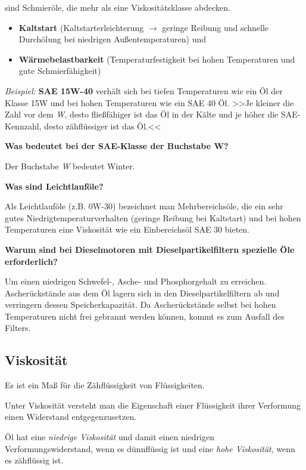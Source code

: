 sind Schmieröle, die mehr als eine Viskositätsklasse abdecken.

\begin{itemize}
\item
  \textbf{Kaltstart} (Kaltstarterleichterung $\to$ geringe Reibung und
  schnelle Durchölung bei niedrigen Außentemperaturen) und
\item
  \textbf{Wärmebelastbarkeit} (Temperaturfestigkeit bei hohen
  Temperaturen und gute Schmierfähigkeit)
\end{itemize}

\emph{Beispiel:} \textbf{SAE 15W-40} verhält sich bei tiefen
Temperaturen wie ein Öl der Klasse 15W und bei hohen Temperaturen wie
ein SAE 40 Öl. >>Je kleiner die Zahl vor dem \emph{W}, desto
fließfähiger ist das Öl in der Kälte und je höher die SAE-Kennzahl,
desto zähflüssiger ist das Öl.<<

\textbf{Was bedeutet bei der SAE-Klasse der Buchstabe W?}

Der Buchstabe \emph{W} bedeutet Winter.

\textbf{Was sind Leichtlauföle?}

Als Leichtlauföle (z.B. 0W-30) bezeichnet man Mehrbereichsöle, die ein
sehr gutes Niedrigtemperaturverhalten (geringe Reibung bei Kaltstart)
und bei hohen Temperaturen eine Viskosität wie ein Einbereichsöl SAE 30
bieten.

\textbf{Warum sind bei Dieselmotoren mit Dieselpartikelfiltern spezielle
Öle erforderlich?}

Um einen niedrigen Schwefel-, Asche- und Phosphorgehalt zu erreichen.
Ascherückstände aus dem Öl lagern sich in den Dieselpartikelfiltern ab
und verringern dessen Speicherkapazität. Da Ascherückstände selbst bei
hohen Temperaturen nicht frei gebrannt werden können, kommt es zum
Ausfall des Filters.

\subsection{Viskosität}\label{viskositaet}

Es ist ein Maß für die Zähflüssigkeit von Flüssigkeiten.

Unter Viskosität versteht man die Eigenschaft einer Flüssigkeit ihrer
Verformung einen Widerstand entgegenzusetzen.

Öl hat eine \emph{niedrige Viskosität} und damit einen niedrigen
Verformungswiderstand, wenn es dünnflüssig ist und eine \emph{hohe
Viskosität}, wenn es zähflüssig ist.

